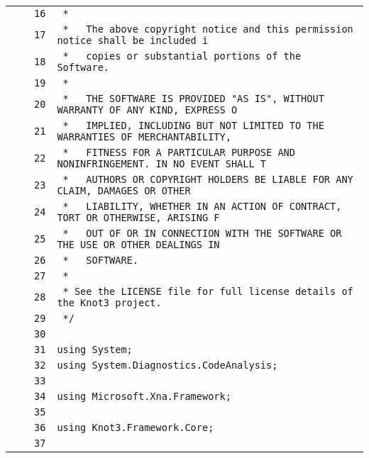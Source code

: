 \documentclass[a4paper,10pt]{article}
\begin{document}
\begin{longtable}[l]{lrrl}
\cellcolor{gray} &  & \verb~16~ & \verb~ *~\\
\cellcolor{gray} &  & \verb~17~ & \verb~ *   The above copyright notice and this permission notice shall be included i~\\
\cellcolor{gray} &  & \verb~18~ & \verb~ *   copies or substantial portions of the Software.~\\
\cellcolor{gray} &  & \verb~19~ & \verb~ *~\\
\cellcolor{gray} &  & \verb~20~ & \verb~ *   THE SOFTWARE IS PROVIDED "AS IS", WITHOUT WARRANTY OF ANY KIND, EXPRESS O~\\
\cellcolor{gray} &  & \verb~21~ & \verb~ *   IMPLIED, INCLUDING BUT NOT LIMITED TO THE WARRANTIES OF MERCHANTABILITY,~\\
\cellcolor{gray} &  & \verb~22~ & \verb~ *   FITNESS FOR A PARTICULAR PURPOSE AND NONINFRINGEMENT. IN NO EVENT SHALL T~\\
\cellcolor{gray} &  & \verb~23~ & \verb~ *   AUTHORS OR COPYRIGHT HOLDERS BE LIABLE FOR ANY CLAIM, DAMAGES OR OTHER~\\
\cellcolor{gray} &  & \verb~24~ & \verb~ *   LIABILITY, WHETHER IN AN ACTION OF CONTRACT, TORT OR OTHERWISE, ARISING F~\\
\cellcolor{gray} &  & \verb~25~ & \verb~ *   OUT OF OR IN CONNECTION WITH THE SOFTWARE OR THE USE OR OTHER DEALINGS IN~\\
\cellcolor{gray} &  & \verb~26~ & \verb~ *   SOFTWARE.~\\
\cellcolor{gray} &  & \verb~27~ & \verb~ *~\\
\cellcolor{gray} &  & \verb~28~ & \verb~ * See the LICENSE file for full license details of the Knot3 project.~\\
\cellcolor{gray} &  & \verb~29~ & \verb~ */~\\
\cellcolor{gray} &  & \verb~30~ & \verb~~\\
\cellcolor{gray} &  & \verb~31~ & \verb~using System;~\\
\cellcolor{gray} &  & \verb~32~ & \verb~using System.Diagnostics.CodeAnalysis;~\\
\cellcolor{gray} &  & \verb~33~ & \verb~~\\
\cellcolor{gray} &  & \verb~34~ & \verb~using Microsoft.Xna.Framework;~\\
\cellcolor{gray} &  & \verb~35~ & \verb~~\\
\cellcolor{gray} &  & \verb~36~ & \verb~using Knot3.Framework.Core;~\\
\cellcolor{gray} &  & \verb~37~ & \verb~~\\

\end{longtable}
\end{document}
